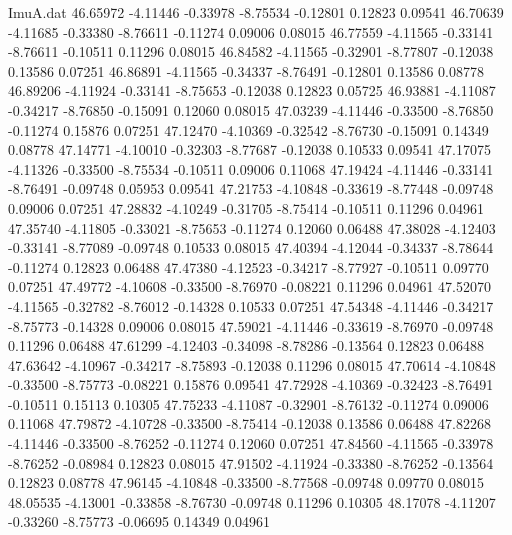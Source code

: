 \begin{filecontents}{ImuA.dat}
  46.65972   -4.11446   -0.33978   -8.75534   -0.12801    0.12823    0.09541
  46.70639   -4.11685   -0.33380   -8.76611   -0.11274    0.09006    0.08015
  46.77559   -4.11565   -0.33141   -8.76611   -0.10511    0.11296    0.08015
  46.84582   -4.11565   -0.32901   -8.77807   -0.12038    0.13586    0.07251
  46.86891   -4.11565   -0.34337   -8.76491   -0.12801    0.13586    0.08778
  46.89206   -4.11924   -0.33141   -8.75653   -0.12038    0.12823    0.05725
  46.93881   -4.11087   -0.34217   -8.76850   -0.15091    0.12060    0.08015
  47.03239   -4.11446   -0.33500   -8.76850   -0.11274    0.15876    0.07251
  47.12470   -4.10369   -0.32542   -8.76730   -0.15091    0.14349    0.08778
  47.14771   -4.10010   -0.32303   -8.77687   -0.12038    0.10533    0.09541
  47.17075   -4.11326   -0.33500   -8.75534   -0.10511    0.09006    0.11068
  47.19424   -4.11446   -0.33141   -8.76491   -0.09748    0.05953    0.09541
  47.21753   -4.10848   -0.33619   -8.77448   -0.09748    0.09006    0.07251
  47.28832   -4.10249   -0.31705   -8.75414   -0.10511    0.11296    0.04961
  47.35740   -4.11805   -0.33021   -8.75653   -0.11274    0.12060    0.06488
  47.38028   -4.12403   -0.33141   -8.77089   -0.09748    0.10533    0.08015
  47.40394   -4.12044   -0.34337   -8.78644   -0.11274    0.12823    0.06488
  47.47380   -4.12523   -0.34217   -8.77927   -0.10511    0.09770    0.07251
  47.49772   -4.10608   -0.33500   -8.76970   -0.08221    0.11296    0.04961
  47.52070   -4.11565   -0.32782   -8.76012   -0.14328    0.10533    0.07251
  47.54348   -4.11446   -0.34217   -8.75773   -0.14328    0.09006    0.08015
  47.59021   -4.11446   -0.33619   -8.76970   -0.09748    0.11296    0.06488
  47.61299   -4.12403   -0.34098   -8.78286   -0.13564    0.12823    0.06488
  47.63642   -4.10967   -0.34217   -8.75893   -0.12038    0.11296    0.08015
  47.70614   -4.10848   -0.33500   -8.75773   -0.08221    0.15876    0.09541
  47.72928   -4.10369   -0.32423   -8.76491   -0.10511    0.15113    0.10305
  47.75233   -4.11087   -0.32901   -8.76132   -0.11274    0.09006    0.11068
  47.79872   -4.10728   -0.33500   -8.75414   -0.12038    0.13586    0.06488
  47.82268   -4.11446   -0.33500   -8.76252   -0.11274    0.12060    0.07251
  47.84560   -4.11565   -0.33978   -8.76252   -0.08984    0.12823    0.08015
  47.91502   -4.11924   -0.33380   -8.76252   -0.13564    0.12823    0.08778
  47.96145   -4.10848   -0.33500   -8.77568   -0.09748    0.09770    0.08015
  48.05535   -4.13001   -0.33858   -8.76730   -0.09748    0.11296    0.10305
  48.17078   -4.11207   -0.33260   -8.75773   -0.06695    0.14349    0.04961

\end{filecontents}
